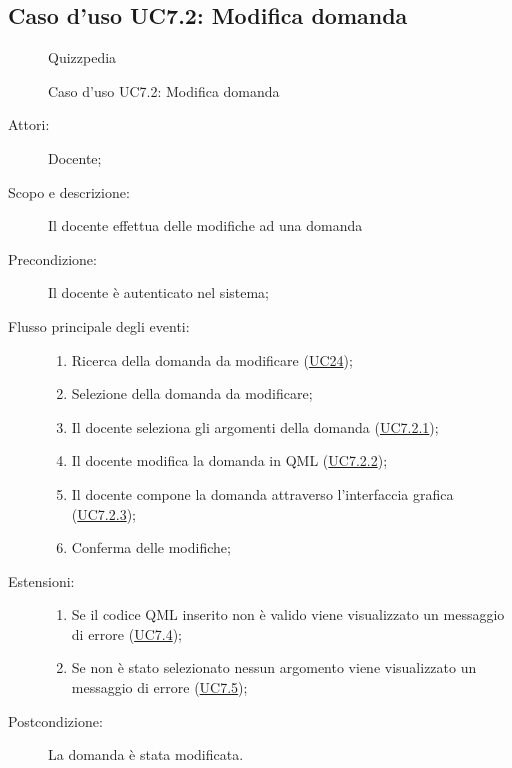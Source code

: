 \subsection{Caso d'uso UC7.2: Modifica domanda}
        \begin{figure}[H]
            \centering
            \begin{resizedtikzpicture}{\textwidth}
		\begin{umlsystem}[x=0, fill=lightgray!20]{Quizzpedia}
		\end{umlsystem}
            \end{resizedtikzpicture}
            \caption{Caso d'uso UC7.2: Modifica domanda}
            \label{fig:UC7.2} 
        \end{figure}
    \begin{description}
\item[Attori:] Docente;
\item[Scopo e descrizione:] Il docente effettua delle modifiche ad una domanda 
      \item[Precondizione:] Il docente è autenticato nel sistema;

        \item[Flusso principale degli eventi:] \begin{enumerate}
          \item Ricerca della domanda da modificare (\hyperlink{UC24}{UC24});
          \item Selezione della domanda da modificare;
          \item Il docente seleziona gli argomenti della domanda	 (\hyperlink{UC7.2.1}{UC7.2.1});
          \item Il docente modifica la domanda in QML	 (\hyperlink{UC7.2.2}{UC7.2.2});
          \item Il docente compone la domanda attraverso l'interfaccia grafica (\hyperlink{UC7.2.3}{UC7.2.3});
          \item Conferma delle modifiche;

      \end{enumerate}
    \item[Estensioni:]
      \begin{enumerate}
          \item Se il codice QML inserito non è valido viene visualizzato un messaggio di errore (\hyperlink{UC7.4}{UC7.4});
          \item Se non è stato selezionato nessun argomento viene visualizzato un messaggio di errore (\hyperlink{UC7.5}{UC7.5});

      \end{enumerate}
    \item[Postcondizione:] La domanda è stata modificata.
  \end{description}
\hypertarget{UC7.2.1}{}
